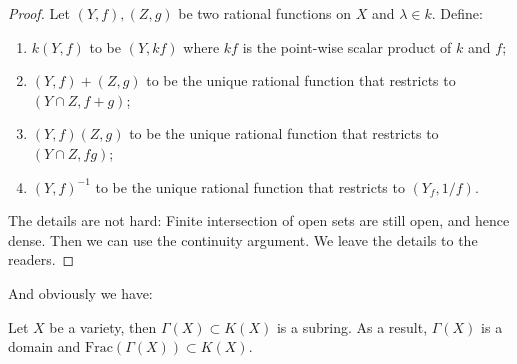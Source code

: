 \documentclass{note-eng}
\begin{document}
\begin{proof}
    Let $(Y, f), (Z, g)$ be two rational functions on $X$ and $\lambda \in k$. Define:
    \begin{enumerate}
        \item $k (Y, f)$ to be $(Y, kf)$ where $kf$ is the point-wise scalar product of $k$ and $f$;
        \item $(Y, f) + (Z, g)$ to be the unique rational function that restricts to $(Y \cap Z, f + g)$;
        \item $(Y, f) (Z, g)$ to be the unique rational function that restricts to $(Y \cap Z, f g)$;
        \item $(Y, f) ^{-1}$ to be the unique rational function that restricts to $(Y_f, 1 / f)$.
    \end{enumerate}

    The details are not hard: Finite intersection of open sets are still open, and hence dense. Then we can use the continuity argument. We leave the details to the readers.
\end{proof}

And obviously we have:

\begin{proposition}\label{prop:ring-of-regular-subset-rational-field}
    Let $X$ be a variety, then $\Gamma(X) \subset K(X)$ is a subring. As a result, $\Gamma(X)$ is a domain and $\mathrm{Frac}(\Gamma(X)) \subset K(X)$.
\end{proposition}

\iffalse
Since $K(X)$ is a field, we must have $\mathrm{Frac}(\Gamma(X)) \cong K(X)$. Actually the converse also holds:

\begin{proposition}
    Let $X$ be a variety, then $K(X) \cong \mathrm{Frac}(\Gamma(X))$.
\end{proposition}

\begin{proof}
    We only prove the case for quasi-projective varieties, the proof for affine cases are basically the same, except simpler.

    Take $(Y, f) \in K(X)$, then $Y \ne \emptyset$ by maximality. Pick $P \in Y$, by definition there are homogeneous polynomials $G, H$ of the same degree $d$ such that $f = G / H$ on an open neighborhood of $P$. WLOG, suppose $P \in U_{n + 1}$. Now take $g = G / X_{n + 1}^d, h = X_{n + 1}^d / H$. Then $g, h \in \Gamma$
\end{proof}

\fi
\end{document}
